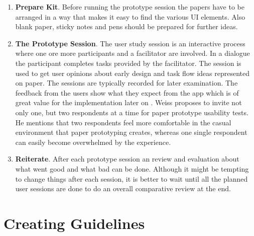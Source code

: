 \begin{enumerate}
	
	\item \textbf{Prepare Kit}. Before running the prototype session the papers have to be arranged in a way that makes it easy to find the various UI elements. Also blank paper, sticky notes and pens should be prepared for further ideas.
	\item \textbf{The Prototype Session}. The user study session is an interactive process where one ore more participants and a facilitator are involved. In a dialogue the participant completes tasks provided by the facilitator. The session is used to get user opinions about early design and task flow ideas represented on paper. The sessions are typically recorded for later examination. The feedback from the users show what they expect from the app which is of great value for the implementation later on \cite{snyder2003paper}. Weiss  \cite[p.~144]{weiss2003handheld} proposes to invite not only one, but two respondents at a time for paper prototype usability tests. He mentions that two respondents feel more comfortable in the casual environment that paper prototyping creates, whereas one single respondent can easily become overwhelmed by the experience.
	\item \textbf{Reiterate}. After each prototype session an review and evaluation about what went good and what bad can be done. Although it might be tempting to change things after each session, it is better to wait until all the planned user sessions are done to do an overall comparative review at the end.
\end{enumerate}

\section{Creating Guidelines}